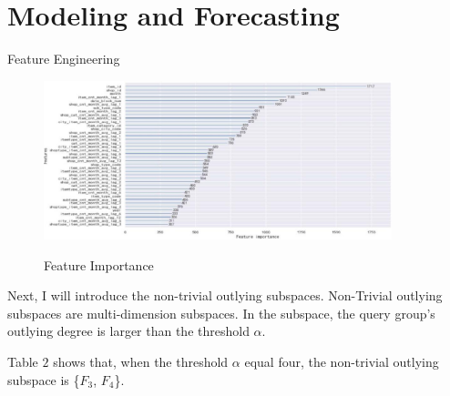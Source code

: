 \documentclass[
 size=12pt,
 paper=smartboard,  %
 mode=present, 		%
 display=slides, 	%
 style=tuliplab,  	%
 pauseslide,
 fleqn,leqno]{powerdot}
\begin{document}
\section{Modeling and Forecasting}
\begin{slide}{Feature Engineering}
  \begin{figure}[htbp]
    \centering
    \includegraphics[width=0.9\textwidth,height=0.5\textwidth]{figures/Figure8.eps}\\
    \caption{Feature Importance}
  \end{figure}
  
  \begin{note}
  Next,
  I will introduce the non-trivial outlying subspaces.
  Non-Trivial outlying subspaces are multi-dimension subspaces.
  In the subspace,
  the query group's outlying degree is larger than the threshold $\alpha$.
  
  Table $2$ shows that,
  when the threshold $\alpha$ equal four,
  the non-trivial outlying subspace is \{$F_3$, $F_4$\}.
  \end{note}
  
  \end{slide}
\end{document}
